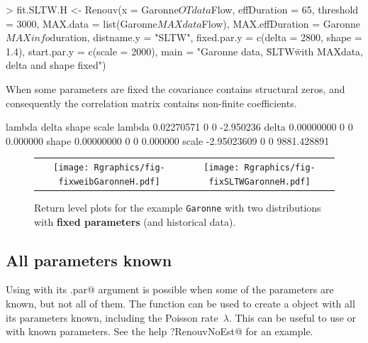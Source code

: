 \documentclass[a4paper]{report}
\begin{document}
\begin{Schunk}
\begin{Sinput}
> fit.SLTW.H <- 
    Renouv(x = Garonne$OTdata$Flow,
           effDuration = 65, threshold = 3000,
           MAX.data = list(Garonne$MAXdata$Flow),
           MAX.effDuration = Garonne$MAXinfo$duration,
           distname.y = "SLTW",
           fixed.par.y = c(delta = 2800, shape = 1.4),
           start.par.y = c(scale = 2000),
           main = "Garonne data, \"SLTW\" with MAXdata, delta and shape fixed")
\end{Sinput}
\end{Schunk}

\noindent
When some parameters are fixed the covariance contains structural
zeros, and consequently the correlation matrix contains non-finite coefficients.

\begin{Schunk}
\begin{Soutput}
            lambda delta shape       scale
lambda  0.02270571     0     0   -2.950236
delta   0.00000000     0     0    0.000000
shape   0.00000000     0     0    0.000000
scale  -2.95023609     0     0 9881.428891
\end{Soutput}
\end{Schunk}

\begin{figure}
   \centering
   \begin{tabular}{c c} 
     \texttt{[image: Rgraphics/fig-fixweibGaronneH.pdf]} &
     \texttt{[image: Rgraphics/fig-fixSLTWGaronneH.pdf]} 
   \end{tabular}
   \caption{Return level plots for the example \texttt{Garonne} with two distributions 
     with \textbf{fixed parameters} (and historical data).}
\end{figure}

\subsection{All parameters known}
Using \verb@Renouv@ with its \verb@fixed.par@ argument is possible  when
some of the parameters are known, but not all of them.
The \verb@RenouvNoEst@ function can be used to create a \verb@Renouv@
object with all its parameters known, including the Poisson 
rate~$\lambda$. This can be useful to use \verb@plot@ or \verb@predict@
with known parameters. See the help \verb@?RenouvNoEst@ for 
an example.
\end{document}
